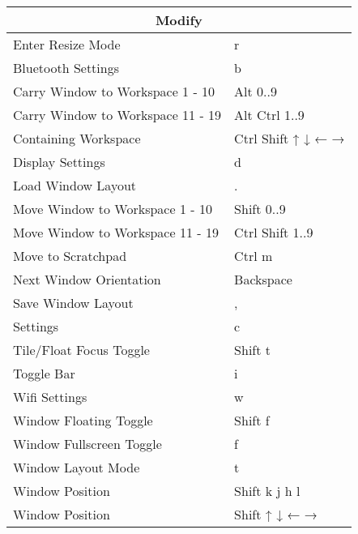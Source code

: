 \documentclass[12pt,paper=landscape,paper=a4]{scrartcl}
\begin{document}
\begin{multicols}{2}
    \begin{tabular}{ll}
         \multicolumn{2}{c}{Modify}\\
         \hline
         Enter Resize Mode                  & \faWindows{} r\\
         Bluetooth Settings                 & \faWindows{} b\\
         Carry Window to Workspace 1 - 10   & \faWindows{} Alt 0..9\\
         Carry Window to Workspace 11 - 19  & \faWindows{} Alt Ctrl 1..9\\
         Containing Workspace               & \faWindows{} Ctrl Shift ↑ ↓ ← →\\
         Display Settings                   & \faWindows{} d\\
         Load Window Layout                 & \faWindows{} .\\
         Move Window to Workspace 1 - 10    & \faWindows{} Shift 0..9\\
         Move Window to Workspace 11 - 19   & \faWindows{} Ctrl Shift 1..9\\
         Move to Scratchpad                 & \faWindows{} Ctrl m\\
         Next Window Orientation            & \faWindows{} Backspace\\
         Save Window Layout                 & \faWindows{} ,\\
         Settings                           & \faWindows{} c\\
         Tile/Float Focus Toggle            & \faWindows{} Shift t\\
         Toggle Bar                         & \faWindows{} i\\
         Wifi Settings                      & \faWindows{} w\\
         Window Floating Toggle             & \faWindows{} Shift f\\
         Window Fullscreen Toggle           & \faWindows{} f\\
         Window Layout Mode                 & \faWindows{} t\\
         Window Position                    & \faWindows{} Shift k j h l\\
         Window Position                    & \faWindows{} Shift ↑ ↓ ← →
     \end{tabular}

    \vspace{1em}


\end{multicols}
\end{document}

